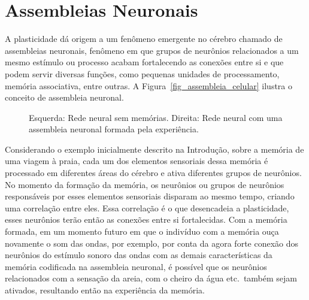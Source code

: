 \section{Assembleias Neuronais}

A plasticidade dá origem a um fenômeno emergente no cérebro chamado de assembleias neuronais, fenômeno em que grupos de neurônios
relacionados a um mesmo estímulo ou processo acabam fortalecendo as conexões entre si e que podem servir diversas funções, como
pequenas unidades de processamento, memória associativa, entre outras. A Figura~\ref{fig_assembleia_celular} ilustra o conceito de
assembleia neuronal.

\begin{figure}[!ht]
\caption{Esquerda: Rede neural sem memórias. Direita: Rede neural com uma assembleia neuronal formada pela experiência.}
\end{figure}

Considerando o exemplo inicialmente descrito na Introdução, sobre a memória de uma viagem à praia, cada um dos elementos
sensoriais dessa memória é processado em diferentes áreas do cérebro e ativa diferentes grupos de neurônios. No momento da
formação da memória, os neurônios ou grupos de neurônios responsáveis por esses elementos sensoriais disparam ao mesmo tempo,
criando uma correlação entre eles. Essa correlação é o que desencadeia a plasticidade, esses neurônios terão então as conexões
entre si fortalecidas. Com a memória formada, em um momento futuro em que o indivíduo com a memória ouça novamente o som das
ondas, por exemplo, por conta da agora forte conexão dos neurônios do estímulo sonoro das ondas com as demais características da
memória codificada na assembleia neuronal, é possível que os neurônios relacionados com a sensação da areia, com o cheiro da água
etc.\ também sejam ativados, resultando então na experiência da memória.


